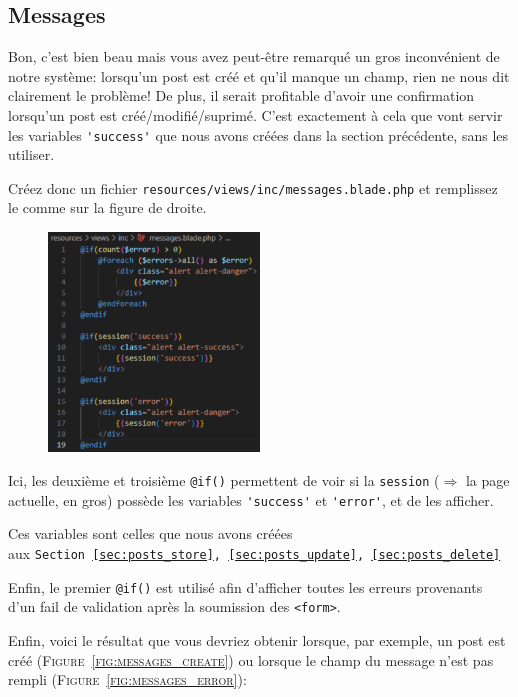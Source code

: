 \subsection{Messages}\label{sec:messages}
Bon, c'est bien beau mais vous avez peut-être remarqué un gros inconvénient de notre système: lorsqu'un post est créé et qu'il manque un champ, rien ne nous dit clairement le problème! De plus, il serait profitable d'avoir une confirmation lorsqu'un post est créé/modifié/suprimé. C'est exactement à cela que vont servir les variables \verb|'success'| que nous avons créées dans la section précédente, sans les utiliser.

Créez donc un fichier \verb|resources/views/inc/messages.blade.php| et remplissez le comme sur la figure de droite.

\begin{figure}
    \vspace{-0.5cm}
    \includegraphics[width=0.5\textwidth]{figures-C1/messages_blade.pdf}
\end{figure}
Ici, les deuxième et troisième \verb|@if()| permettent de voir si la \verb|session| ($\Rightarrow$ la page actuelle, en gros) possède les variables \verb|'success'| et \verb|'error'|, et de les afficher. 

Ces variables sont celles que nous avons créées \\ aux \texttt{Section~\ref{sec:posts_store},~\ref{sec:posts_update},~\ref{sec:posts_delete}}

Enfin, le premier \verb|@if()| est utilisé afin d'afficher toutes les erreurs provenants d'un fail de validation après la soumission des \verb|<form>|.

\vspace{4cm}

Enfin, voici le résultat que vous devriez obtenir lorsque, par exemple, un post est créé (\textsc{Figure~\ref{fig:messages_create}}) ou lorsque le champ du message n'est pas rempli (\textsc{Figure~\ref{fig:messages_error}}):

